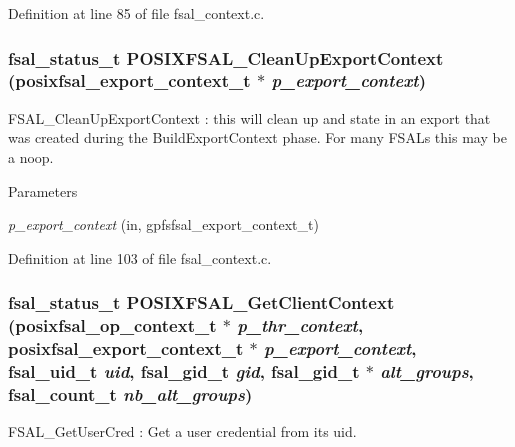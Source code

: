 Definition at line 85 of file fsal\_\-context.c.
\subsubsection[{POSIXFSAL\_\-CleanUpExportContext}]{\setlength{\rightskip}{0pt plus 5cm}fsal\_\-status\_\-t POSIXFSAL\_\-CleanUpExportContext (posixfsal\_\-export\_\-context\_\-t $\ast$ {\em p\_\-export\_\-context})}\label{group__FSALCredFunctions_ga1eb505b8784f1e1a0808dfffd8e39031}
FSAL\_\-CleanUpExportContext : this will clean up and state in an export that was created during the BuildExportContext phase. For many FSALs this may be a noop.


\begin{DoxyParams}{Parameters}
\item[{\em p\_\-export\_\-context}](in, gpfsfsal\_\-export\_\-context\_\-t) \end{DoxyParams}


Definition at line 103 of file fsal\_\-context.c.
\subsubsection[{POSIXFSAL\_\-GetClientContext}]{\setlength{\rightskip}{0pt plus 5cm}fsal\_\-status\_\-t POSIXFSAL\_\-GetClientContext (posixfsal\_\-op\_\-context\_\-t $\ast$ {\em p\_\-thr\_\-context}, \/  posixfsal\_\-export\_\-context\_\-t $\ast$ {\em p\_\-export\_\-context}, \/  fsal\_\-uid\_\-t {\em uid}, \/  fsal\_\-gid\_\-t {\em gid}, \/  fsal\_\-gid\_\-t $\ast$ {\em alt\_\-groups}, \/  fsal\_\-count\_\-t {\em nb\_\-alt\_\-groups})}\label{group__FSALCredFunctions_ga9d9d25a445cb23866f53df2453f9c091}
FSAL\_\-GetUserCred : Get a user credential from its uid.


